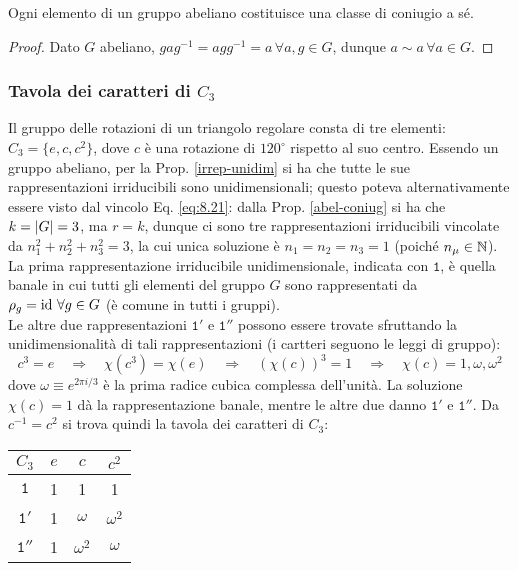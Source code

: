 \begin{proposition}\label{abel-coniug}
	Ogni elemento di un gruppo abeliano costituisce una classe di coniugio a sé.
\end{proposition}
\begin{proof}
	Dato $ G $ abeliano, $ gag^{-1} = agg^{-1} = a \,\forall a,g \in G $, dunque $ a \sim a \,\forall a \in G $.
\end{proof}

\subsubsection{Tavola dei caratteri di \texorpdfstring{$ C_3 $}{TEXT}}

Il gruppo delle rotazioni di un triangolo regolare consta di tre elementi: $ C_3 = \{e,c,c^2\} $, dove $ c $ è una rotazione di $ 120^{\circ} $ rispetto al suo centro. Essendo un gruppo abeliano, per la Prop. \ref{irrep-unidim} si ha che tutte le sue rappresentazioni irriducibili sono unidimensionali; questo poteva alternativamente essere visto dal vincolo Eq. \ref{eq:8.21}: dalla Prop. \ref{abel-coniug} si ha che $ k = \left\lvert G\right\rvert = 3 $, ma $ r = k $, dunque ci sono tre rappresentazioni irriducibili vincolate da $ n_1^2 + n_2^2 + n_3^2 = 3 $, la cui unica soluzione è $ n_1 = n_2 = n_3 = 1 $ (poiché $ n_{\mu} \in \mathbb{N} $).\\
La prima rappresentazione irriducibile unidimensionale, indicata con $ \mathtt{1} $, è quella banale in cui tutti gli elementi del gruppo $ G $ sono rappresentati da $ \rho_g = \operatorname{id} \,\forall g \in G $ (è comune in tutti i gruppi).\\
Le altre due rappresentazioni $ \mathtt{1}' $ e $ \mathtt{1}'' $ possono essere trovate sfruttando la unidimensionalità di tali rappresentazioni (i cartteri seguono le leggi di gruppo):
\begin{equation*}
	c^3 = e \quad \Rightarrow \quad \chi(c^3) = \chi(e) \quad \Rightarrow \quad (\chi(c))^3 = 1 \quad \Rightarrow \quad \chi(c) = 1, \omega, \omega^2
\end{equation*}
dove $ \omega \equiv e^{2\pi i / 3} $ è la prima radice cubica complessa dell'unità. La soluzione $ \chi(c) = 1 $ dà la rappresentazione banale, mentre le altre due danno $ \mathtt{1}' $ e $ \mathtt{1}'' $. Da $ c^{-1} = c^2 $ si trova quindi la tavola dei caratteri di $ C_3 $:

\begin{table}[H]
	\centering
	\begin{tabular}{c|ccc}
		$ C_3 $ & $ e $ & $ c $ & $ c^2 $ \\
		\hline
		$ \mathtt{1} $ & 1 & 1 & 1 \\
		$ \mathtt{1}' $ & 1 & $ \omega $ & $ \omega^2 $ \\
		$ \mathtt{1}'' $ & 1 & $ \omega^2 $ & $ \omega $
	\end{tabular}
\end{table}

